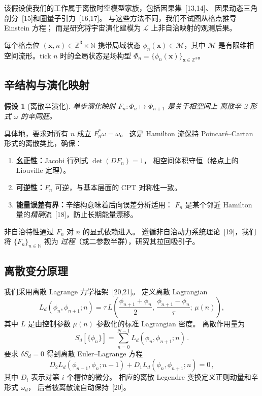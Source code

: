 \documentclass[a4paper,11pt]{article}
\theoremstyle{plain}
\newtheorem{assumption}{假设}
\newcommand{\ZZ}{\mathbb{Z}}
\newcommand{\NN}{\mathbb{N}}
\begin{document}
该假设使我们的工作属于离散时空模型家族，包括因果集~[13,14]、
因果动态三角剖分~[15]和圈量子引力~[16,17]。
与这些方法不同，我们不试图从格点推导 Einstein 方程；
而是研究将宇宙演化建模为 $\mathcal{L}$ 上非自治映射的观测后果。

每个格点位 $(\bm{x}, n) \in \ZZ^3 \times \NN$ 携带局域状态
$\phi_n(\bm{x}) \in \mathcal{M}$，其中 $\mathcal{M}$
是有限维相空间流形。tick $n$ 时的全局状态是场构型
$\Phi_n = \{\phi_n(\bm{x})\}_{\bm{x}\in\ZZ^3}$。

\subsection{辛结构与演化映射}

\begin{assumption}[离散辛演化]\label{ass:symplectic}
单步演化映射 $F_n : \Phi_n \mapsto \Phi_{n+1}$ 是关于相空间上
离散辛 2-形式 $\omega$ 的辛同胚。
\end{assumption}

具体地，要求对所有 $n$ 成立 $F_n^*\omega = \omega$。
这是 Hamilton 流保持 Poincar\'e--Cartan 形式的离散类比，确保：
\begin{enumerate}
  \item \textbf{幺正性：}Jacobi 行列式 $\det(DF_n) = 1$，
    相空间体积守恒（格点上的 Liouville 定理）。
  \item \textbf{可逆性：}$F_n$ 可逆，与基本层面的 CPT 对称性一致。
  \item \textbf{能量误差有界：}辛结构意味着后向误差分析适用：
    $F_n$ 是某个邻近 Hamilton 量的\emph{精确}流~[18]，防止长期能量漂移。
\end{enumerate}

非自治特性通过 $F_n$ 对 $n$ 的显式依赖进入。
遵循非自治动力系统理论~[19]，我们将 $\{F_n\}_{n\in\NN}$ 视为
\emph{过程}（或二参数半群），研究其拉回吸引子。

\subsection{离散变分原理}

我们采用离散 Lagrange 力学框架~[20,21]。
定义离散 Lagrangian
\begin{equation}
  L_d(\phi_n, \phi_{n+1}; n)
  = \tau\, L\!\left(\frac{\phi_{n+1}+\phi_n}{2},\,
    \frac{\phi_{n+1}-\phi_n}{\tau};\, \mu(n)\right),
\end{equation}
其中 $L$ 是由控制参数 $\mu(n)$ 参数化的标准 Lagrangian 密度。
离散作用量为
\begin{equation}
  S_d[\{\phi_n\}] = \sum_{n=0}^{N-1} L_d(\phi_n, \phi_{n+1}; n)\,.
\end{equation}
要求 $\delta S_d = 0$ 得到离散 Euler--Lagrange 方程
\begin{equation}
  D_2 L_d(\phi_{n-1},\phi_n; n{-}1) + D_1 L_d(\phi_n,\phi_{n+1}; n) = 0\,,
\end{equation}
其中 $D_i$ 表示对第 $i$ 个槽位的微分。
相应的离散 Legendre 变换定义正则动量和辛形式 $\omega_d$，
后者被离散流自动保持~[20]。
\end{document}
